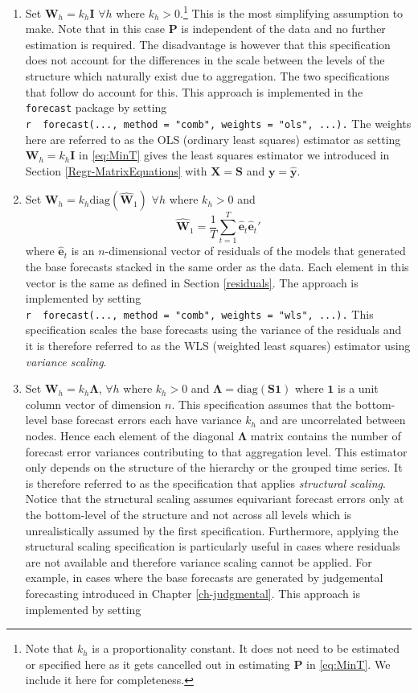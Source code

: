 \documentclass[]{book}
\let\rmarkdownfootnote\footnote%
\def\footnote{\protect\rmarkdownfootnote}
\begin{document}
\begin{enumerate}
\def\labelenumi{\arabic{enumi}.}
\item
  Set \(\bm{W}_h=k_h\bm{I}\) \(\forall h\) where \(k_{h} > 0\).\footnote{Note that \(k_{h}\) is a proportionality constant. It does not need to be estimated or specified here as it gets cancelled out in estimating \(\bm{P}\) in \eqref{eq:MinT}. We include it here for completeness.} This is the most simplifying assumption to make. Note that in this case \(\bm{P}\) is independent of the data and no further estimation is required. The disadvantage is however that this specification does not account for the differences in the scale between the levels of the structure which naturally exist due to aggregation. The two specifications that follow do account for this. This approach is implemented in the \texttt{forecast} package by setting
  \texttt{r\ \ forecast(...,\ method\ =\ "comb",\ weights\ =\ "ols",\ ...).}
  The weights here are referred to as the OLS (ordinary least squares) estimator as setting \(\bm{W}_h=k_h\bm{I}\) in \eqref{eq:MinT} gives the least squares estimator we introduced in Section \ref{Regr-MatrixEquations} with \(\bm{X}=\bm{S}\) and \(\bm{y}=\hat{\bm{y}}\).
\item
  Set \(\bm{W}_{h} = k_{h}\text{diag}(\hat{\bm{W}}_{1})\) \(\forall h\) where \(k_{h} > 0\) and
  \[
       \hat{\bm{W}}_{1} = \frac{1}{T}\sum_{t=1}^{T}\hat{\bm{e}}_{t}\hat{\bm{e}}_{t}'
   \]
  where \(\hat{\bm{e}}_{t}\) is an \(n\)-dimensional vector of residuals of the models that generated the base forecasts stacked in the same order as the data. Each element in this vector is the same as defined in Section \ref{residuals}. The approach is implemented by setting
  \texttt{r\ \ forecast(...,\ method\ =\ "comb",\ weights\ =\ "wls",\ ...).}
  This specification scales the base forecasts using the variance of the residuals and it is therefore referred to as the WLS (weighted least squares) estimator using \emph{variance scaling}.
\item
  Set \(\bm{W}_{h}=k_{h}\bm{\Lambda}\), \(\forall h\) where \(k_{h} > 0\) and \(\bm{\Lambda}=\text{diag}(\bm{S}\bm{1})\) where \(\bm{1}\) is a unit column vector of dimension \(n\). This specification assumes that the bottom-level base forecast errors each have variance \(k_{h}\) and are uncorrelated between nodes. Hence each element of the diagonal \(\bm{\Lambda}\) matrix contains the number of forecast error variances contributing to that aggregation level. This estimator only depends on the structure of the hierarchy or the grouped time series. It is therefore referred to as the specification that applies \emph{structural scaling}. Notice that the structural scaling assumes equivariant forecast errors only at the bottom-level of the structure and not across all levels which is unrealistically assumed by the first specification. Furthermore, applying the structural scaling specification is particularly useful in cases where residuals are not available and therefore variance scaling cannot be applied. For example, in cases where the base forecasts are generated by judgemental forecasting introduced in Chapter \ref{ch-judgmental}. This approach is implemented by setting

\end{enumerate}
\end{document}
